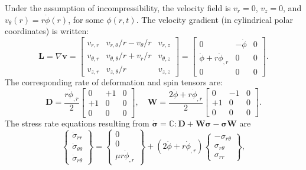 Under the assumption of incompressibility, the velocity field is $v_r = 0$, $v_z = 0$, and $v_\theta (r) = r \dot{\phi}(r)$, for some $\phi(r,t)$. The velocity gradient (in cylindrical polar coordinates) is written:
\begin{equation}
  \mathbf{L} = \nabla \mathbf{v} = \left[ \begin{array}{ccc} v_{r,r} & v_{r,\theta}/r-v_\theta /r & v_{r,z} \\
      v_{\theta,r} & v_{\theta,\theta}/r + v_r /r & v_{\theta,z} \\
      v_{z,r} & v_{z,\theta} /r & v_{z,z} \end{array} \right] = 
  \left[ \begin{array}{ccc} 0 & -\dot{\phi} & 0 \\
      \dot{\phi} + r \dot{\phi}_{,r} & 0 & 0 \\
      0 & 0 & 0 \end{array} \right].
\end{equation}
The corresponding rate of deformation and spin tensors are:
\begin{equation}
  \mathbf{D} = \frac{r \dot{\phi}_{,r}}{2} \left[ \begin{array}{ccc} 0 & +1 & 0 \\
      +1 & 0 & 0 \\
      0 & 0 & 0 \end{array} \right], \quad \mathbf{W} = 
  \frac{2 \dot{\phi} + r \dot{\phi}_{,r}}{2} \left[ \begin{array}{ccc} 0 & - 1 & 0 \\
      +1 & 0 & 0 \\
      0 & 0 & 0 \end{array} \right].
\end{equation}
The stress rate equations resulting from $\dot{\boldsymbol{\sigma}} = \mathbb{C} : \mathbf{D} + \mathbf{W} \boldsymbol{\sigma} - \boldsymbol{\sigma} \mathbf{W}$ are
\begin{equation}
  \left\{ \begin{array}{c} \dot{\sigma}_{rr} \\ \dot{\sigma}_{\theta \theta} \\ \dot{\sigma}_{r \theta} \end{array} \right\} = \left\{ \begin{array}{c} 0 \\ 0 \\ \mu r \dot{\phi}_{,r} \end{array} \right\} + 
  (2 \dot{\phi} + r \dot{\phi}_{,r}) \left\{ \begin{array}{c} - \sigma_{r \theta} \\ \sigma_{r \theta} \\ \sigma_{rr} \end{array} \right\},
\end{equation}
